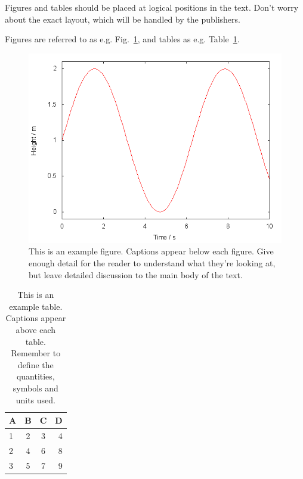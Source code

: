 \documentclass[fleqn,usenatbib,]{mnras}
\begin{document}
Figures and tables should be placed at logical positions in the text. Don't
worry about the exact layout, which will be handled by the publishers.

Figures are referred to as e.g. Fig.~\ref{fig:example_figure}, and tables as
e.g. Table~\ref{tab:example_table}.

\begin{figure}
	\includegraphics[width=\columnwidth]{example}
    \caption{This is an example figure. Captions appear below each figure.
	Give enough detail for the reader to understand what they're looking at,
	but leave detailed discussion to the main body of the text.}
    \label{fig:example_figure}
\end{figure}

\begin{table}
	\centering
	\caption{This is an example table. Captions appear above each table.
	Remember to define the quantities, symbols and units used.}
	\label{tab:example_table}
	\begin{tabular}{lccr} %
		\hline
		A & B & C & D\\
		\hline
		1 & 2 & 3 & 4\\
		2 & 4 & 6 & 8\\
		3 & 5 & 7 & 9\\
		\hline
	\end{tabular}
\end{table}
\end{document}
